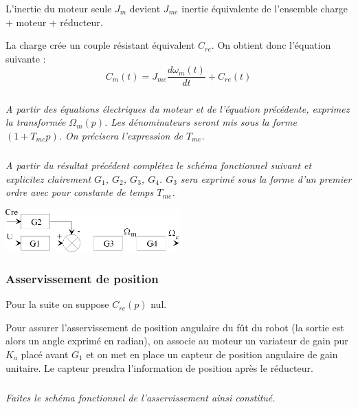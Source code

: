 \documentclass[11pt,oneside]{article}
\begin{document}
L’inertie du moteur seule $J_m$ devient $J_{me}$ inertie équivalente de l’ensemble  charge + moteur + réducteur.

La charge crée un couple résistant équivalent $C_{re}$. On obtient donc l’équation suivante :
$$
C_m(t)=J_{me}\dfrac{d\omega_m(t)}{dt} + C_{re}(t)
$$



\subparagraph{}
\textit{A partir des équations électriques du moteur et de l’équation précédente, exprimez la transformée $\Omega_m(p)$. Les dénominateurs seront mis sous la forme $(1+T_{me} p)$. On précisera l’expression de $T_{me}$.}


\subparagraph{}
\textit{A partir du résultat précédent complétez le schéma fonctionnel suivant et explicitez clairement $G_1$, $G_2$, $G_3$, $G_4$. $G_3$ sera exprimé sous la forme d’un premier ordre avec pour constante de temps $T_{me}$.}

\begin{center}
\includegraphics[width=0.5\textwidth]{png/fig_03}
\end{center}


\subsubsection*{Asservissement de position}

Pour la suite on suppose $C_{re}(p)$  nul. 

 Pour assurer l’asservissement de position angulaire du fût du robot (la sortie est alors un angle exprimé en radian), on associe au moteur un variateur de gain pur $K_a$ placé avant $G_1$ et on met en place un capteur de position angulaire de gain unitaire. Le capteur prendra l’information de position après le réducteur.



\subparagraph{}
\textit{Faites le schéma fonctionnel de l’asservissement ainsi constitué.}

\end{document}
